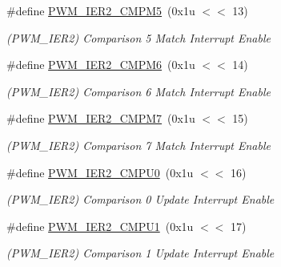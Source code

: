 \begin{DoxyCompactItemize}
\mbox{\label{group__SAME70__PWM_gac85a721c9751d05ea064ca180b45d98a}} 
\#define \mbox{\hyperlink{group__SAME70__PWM_gac85a721c9751d05ea064ca180b45d98a}{P\+W\+M\+\_\+\+I\+E\+R2\+\_\+\+C\+M\+P\+M5}}~(0x1u $<$$<$ 13)
\begin{DoxyCompactList}\small\item\em (P\+W\+M\+\_\+\+I\+E\+R2) Comparison 5 Match Interrupt Enable \end{DoxyCompactList}\item 
\mbox{\label{group__SAME70__PWM_ga5a109538ada1094ded88aa1e09d0aca6}} 
\#define \mbox{\hyperlink{group__SAME70__PWM_ga5a109538ada1094ded88aa1e09d0aca6}{P\+W\+M\+\_\+\+I\+E\+R2\+\_\+\+C\+M\+P\+M6}}~(0x1u $<$$<$ 14)
\begin{DoxyCompactList}\small\item\em (P\+W\+M\+\_\+\+I\+E\+R2) Comparison 6 Match Interrupt Enable \end{DoxyCompactList}\item 
\mbox{\label{group__SAME70__PWM_gaa9a7c0c83f409e3d87e205bc17d3c5e5}} 
\#define \mbox{\hyperlink{group__SAME70__PWM_gaa9a7c0c83f409e3d87e205bc17d3c5e5}{P\+W\+M\+\_\+\+I\+E\+R2\+\_\+\+C\+M\+P\+M7}}~(0x1u $<$$<$ 15)
\begin{DoxyCompactList}\small\item\em (P\+W\+M\+\_\+\+I\+E\+R2) Comparison 7 Match Interrupt Enable \end{DoxyCompactList}\item 
\mbox{\label{group__SAME70__PWM_gaf396a39569076b54e9a66a796b9d293d}} 
\#define \mbox{\hyperlink{group__SAME70__PWM_gaf396a39569076b54e9a66a796b9d293d}{P\+W\+M\+\_\+\+I\+E\+R2\+\_\+\+C\+M\+P\+U0}}~(0x1u $<$$<$ 16)
\begin{DoxyCompactList}\small\item\em (P\+W\+M\+\_\+\+I\+E\+R2) Comparison 0 Update Interrupt Enable \end{DoxyCompactList}\item 
\mbox{\label{group__SAME70__PWM_ga9967f725c1d96722b8fad64a5f64aa5f}} 
\#define \mbox{\hyperlink{group__SAME70__PWM_ga9967f725c1d96722b8fad64a5f64aa5f}{P\+W\+M\+\_\+\+I\+E\+R2\+\_\+\+C\+M\+P\+U1}}~(0x1u $<$$<$ 17)
\begin{DoxyCompactList}\small\item\em (P\+W\+M\+\_\+\+I\+E\+R2) Comparison 1 Update Interrupt Enable \end{DoxyCompactList}\item 
$$
\end{DoxyCompactItemize}
